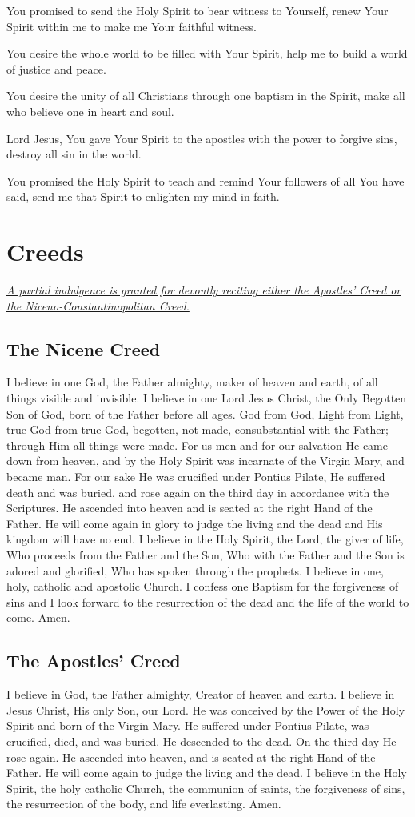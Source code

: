 \documentclass[12pt]{article}
\newcommand{\prayersection}[1]{\section{#1}}
\newcommand{\prayertitle}[1]{\subsection{#1}}
\newcommand{\indulgencedprayertitle}[1]{\prayertitle{#1 \protect\kreuz}}
\newcommand{\emphasis}[1]{\emph{#1}}
\newcommand{\emphasis}[1]{\textsl{#1}}
\newcommand{\note}[1]{{\small{\emphasis{#1}}}\newline}
\newcommand{\linkednote}[2]{\hyperlink{#1}{\note{#2}}}
\begin{document}
You promised to send the Holy Spirit to bear witness to Yourself, renew Your Spirit within me to make me Your faithful witness.

You desire the whole world to be filled with Your Spirit, help me to build a world of justice and peace.

You desire the unity of all Christians through one baptism in the Spirit, make all who believe one in heart and soul.

Lord Jesus, You gave Your Spirit to the apostles with the power to forgive sins, destroy all sin in the world.

You promised the Holy Spirit to teach and remind Your followers of all You have said, send me that Spirit to enlighten my mind in faith.

\newpage

\prayersection{Creeds}
\linkednote{grant28}{A partial indulgence is granted for devoutly reciting either the Apostles' Creed or the Niceno-Constantinopolitan Creed.}
\indulgencedprayertitle{The Nicene Creed}
I believe in one God, the Father almighty, maker of heaven and earth, of all things visible and invisible.
I believe in one Lord Jesus Christ, the Only Begotten Son of God, born of the Father before all ages.
God from God, Light from Light, true God from true God, begotten, not made, consubstantial with the Father;
through Him all things were made.
For us men and for our salvation He came down from heaven, and by the Holy Spirit was incarnate of the Virgin Mary, and became man.
For our sake He was crucified under Pontius Pilate, He suffered death and was buried, and rose again on the third day in accordance with the Scriptures.
He ascended into heaven and is seated at the right Hand of the Father.
He will come again in glory to judge the living and the dead and His kingdom will have no end.
I believe in the Holy Spirit, the Lord, the giver of life, Who proceeds from the Father and the Son, Who with the Father and the Son is adored and glorified, Who has spoken through the prophets.
I believe in one, holy, catholic and apostolic Church.
I confess one Baptism for the forgiveness of sins and I look forward to the resurrection of the dead and the life of the world to come.
Amen.

\indulgencedprayertitle{The Apostles' Creed}
I believe in God, the Father almighty, Creator of heaven and earth.
I believe in Jesus Christ, His only Son, our Lord.
He was conceived by the Power of the Holy Spirit and born of the Virgin Mary.
He suffered under Pontius Pilate, was crucified, died, and was buried.
He descended to the dead.
On the third day He rose again.
He ascended into heaven, and is seated at the right Hand of the Father.
He will come again to judge the living and the dead.
I believe in the Holy Spirit, the holy catholic Church, the communion of saints, the forgiveness of sins, the resurrection of the body, and life everlasting.
Amen.
\end{document}
